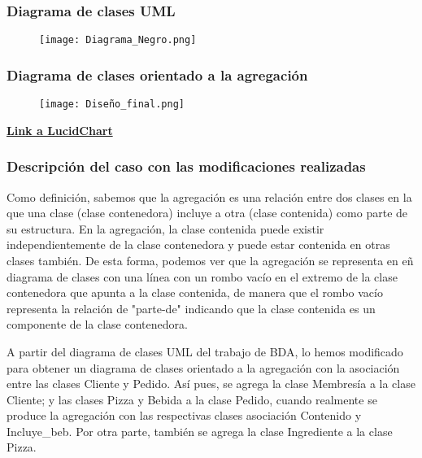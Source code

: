 \documentclass[a4paper]{article}
\begin{document}
\subsubsection{\Large{Diagrama de clases UML}}

\begin{figure}[h]
    \centering
    \texttt{[image: Diagrama\_Negro.png]}
    \label{fig:Diagrama1}
\end{figure}

\newpage

\subsubsection{\Large{Diagrama de clases orientado a la agregación }}

\begin{figure}[h]
    \centering
    \texttt{[image: Diseño\_final.png]}
    \label{fig:Diagrama2}
\end{figure}

\href{https://lucid.app/lucidchart/153030a2-1faa-4c62-8681-491e33fba2da/edit?invitationId=inv_ad99a1d9-e574-47e7-9a09-5404c31e4277&page=Q40Za8zeHSHb#}{\textbf{Link a LucidChart}}

\subsubsection{\Large{Descripción del caso con las modificaciones realizadas}}

\vspace{1.5mm} Como definición, sabemos que la agregación es una relación entre dos clases en la que una clase (clase contenedora) incluye a otra (clase contenida) como parte de su estructura. En la agregación, la clase contenida puede existir independientemente de la clase contenedora y puede estar contenida en otras clases también. De esta forma, podemos ver que la agregación se representa en eñ diagrama de clases con una línea con un rombo vacío en el extremo de la clase contenedora que apunta a la clase contenida, de manera que el rombo vacío representa la relación de "parte-de" indicando que la clase contenida es un componente de la clase contenedora.

\vspace{1.5mm} A partir del diagrama de clases UML del trabajo de BDA, lo hemos modificado para obtener un diagrama de clases orientado a la agregación con la asociación entre las clases Cliente y Pedido. Así pues, se agrega la clase Membresía a la clase Cliente; y las clases Pizza y Bebida a la clase Pedido, cuando realmente se produce la agregación con las respectivas clases asociación Contenido y Incluye\_beb. Por otra parte, también se agrega la clase Ingrediente a la clase Pizza.
\end{document}
